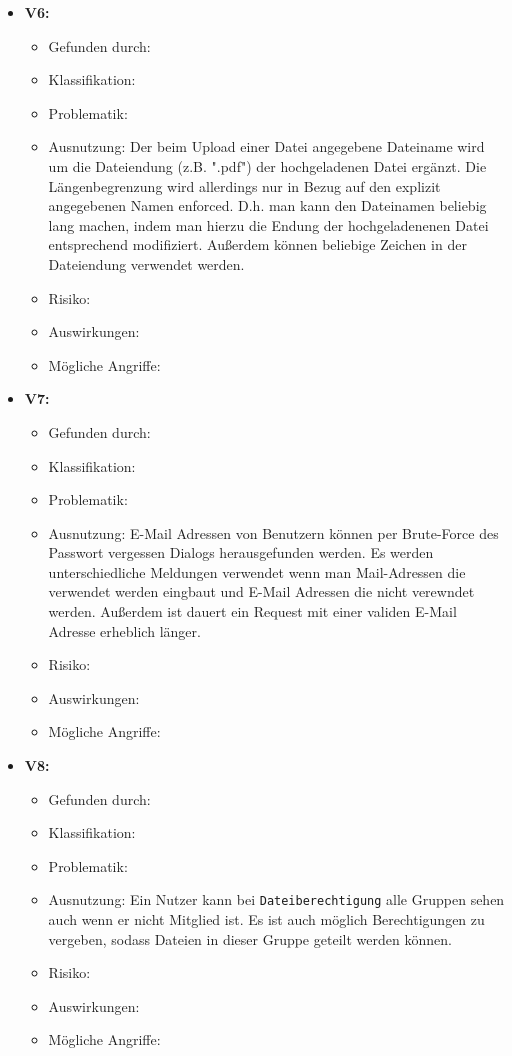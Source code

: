 \documentclass[12pt,DIV14,BCOR10mm,a4paper,parskip=half-,headsepline,headinclude,english,ngerman,bibliography=totocnumbered]{scrreprt}
\begin{document}
\begin{itemize}
  \hypertarget{vulnerability6}{}
  \item \textbf{V6: }
  \begin{itemize}
    \item Gefunden durch:
  \item Klassifikation: 
  \item Problematik:
  \item Ausnutzung: Der beim Upload einer Datei angegebene Dateiname wird um die Dateiendung (z.B. ".pdf") der hochgeladenen Datei ergänzt. Die Längenbegrenzung wird allerdings nur in Bezug auf den explizit angegebenen Namen enforced. D.h. man kann den Dateinamen beliebig lang machen, indem man hierzu die Endung der hochgeladenenen Datei entsprechend modifiziert. Außerdem können beliebige Zeichen in der Dateiendung verwendet werden.
  \item Risiko: 
  \item Auswirkungen: 
  \item Mögliche Angriffe:
  \end{itemize}

  \hypertarget{vulnerability7}{}
  \item \textbf{V7: }
  \begin{itemize}
  \item Gefunden durch:
  \item Klassifikation: 
  \item Problematik:
  \item Ausnutzung: E-Mail Adressen von Benutzern können per Brute-Force des Passwort vergessen Dialogs herausgefunden werden. Es werden unterschiedliche Meldungen verwendet wenn man Mail-Adressen die verwendet werden eingbaut und E-Mail Adressen die nicht verewndet werden. Außerdem ist dauert ein Request mit einer validen E-Mail Adresse erheblich länger.
  \item Risiko: 
  \item Auswirkungen: 
  \item Mögliche Angriffe:
  \end{itemize}

  \hypertarget{vulnerability8}{}
  \item \textbf{V8: }
  \begin{itemize}
  \item Gefunden durch:
  \item Klassifikation: 
  \item Problematik:
  \item Ausnutzung: Ein Nutzer kann bei \texttt{Dateiberechtigung} alle Gruppen sehen auch wenn er nicht Mitglied ist. Es ist auch möglich Berechtigungen zu vergeben, sodass Dateien in dieser Gruppe geteilt werden können.
  \item Risiko: 
  \item Auswirkungen: 
  \item Mögliche Angriffe:
  \end{itemize}


\end{itemize}
\end{document}
